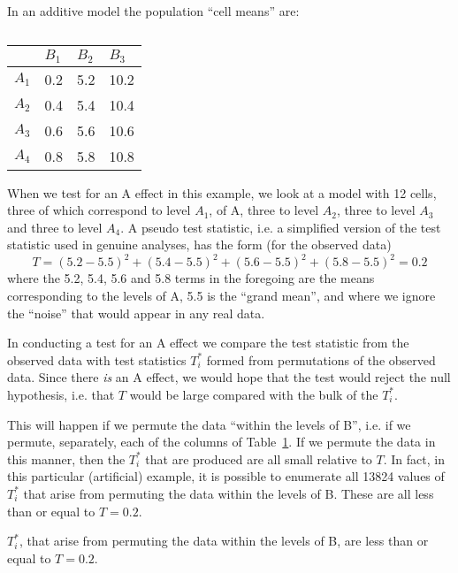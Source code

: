 \documentclass[12pt]{article}
\begin{document}
In an additive model the population ``cell means'' are:
\begin{table}[H]
\caption{\label{tab:exmpl}}
\begin{center}
\begin{tabular}{|l|l|l|l|} \hline
      & $B_1$ & $B_2$ & $B_3$ \\ \hline
$A_1$ & 0.2 & 5.2 & 10.2 \\ \hline
$A_2$ & 0.4 & 5.4 & 10.4 \\ \hline
$A_3$ & 0.6 & 5.6 & 10.6 \\ \hline
$A_4$ & 0.8 & 5.8 & 10.8 \\ \hline
\end{tabular}
\end{center}
\end{table}

When we test for an A effect in this example, we look at a model with 12
cells, three of which correspond to level $A_1$, of A, three to level
$A_2$, three to level $A_3$ and three to level $A_4$.  A pseudo
test statistic, i.e. a simplified version of the test statistic
used in genuine analyses, has the form (for the observed data)
\[
T = (5.2 - 5.5)^2 + (5.4 - 5.5)^2 + (5.6 - 5.5)^2 + (5.8 - 5.5)^2 = 0.2
\]
where the 5.2, 5.4, 5.6 and 5.8 terms in the foregoing are the
means corresponding to the levels of A, 5.5 is the ``grand mean'',
and where we ignore the ``noise'' that would appear in any real data.

In conducting a test for an A effect we compare the test statistic
from the observed data with test statistics $T_i^*$ formed from
permutations of the observed data.  Since there \emph{is} an A
effect, we would hope that the test would reject the null hypothesis,
i.e. that $T$ would be large compared with the bulk of the $T_i^*$.

This will happen if we permute the data ``within the levels
of B'', i.e. if we permute, separately, each of the columns of
Table~\ref{tab:exmpl}.  If we permute the data in this manner,
then the $T_i^*$ that are produced are all small relative to $T$.
In fact, in this particular (artificial) example, it is possible
to enumerate all 13824 values of $T_i^*$ that arise from permuting
the data within the levels of B.  These are all less than or equal
to $T = 0.2$.

$T_i^*$, that arise from permuting the data within the levels of B,
are less than or equal to $T = 0.2$.
\end{document}
